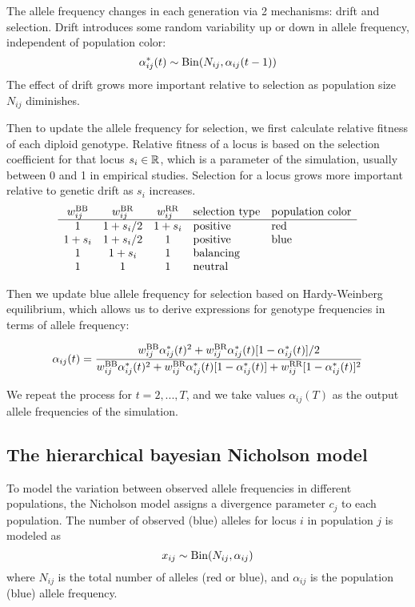 \documentclass[a4paper,12pt]{article}
\begin{document}
The allele frequency changes in each generation via
2 mechanisms: drift and selection. Drift introduces some random
variability up or down in allele frequency, independent of population
color:
$$\alpha_{ij}^*(t) \sim \operatorname{Bin}(N_{ij},\alpha_{ij}(t-1))$$
The effect of drift grows more important relative to selection as
population size $N_{ij}$ diminishes.

Then to update the allele frequency for selection, we first calculate
relative fitness of each diploid genotype. Relative fitness of a locus
is based on the selection coefficient for that locus $s_i\in \mathbb R$,
which is a parameter of the simulation, usually between 0 and 1 in
empirical studies. Selection for a locus grows more important relative
to genetic drift as $s_i$ increases.
$$
\begin{array}{cccll}
w_{ij}^{\text{BB}} & w_{ij}^{\text{BR}} & w_{ij}^{\text{RR}} & \text{selection type} & \text{population color}\\
\hline
1 & 1+s_i/2 & 1+s_i & \text{positive}& \text{red}\\
1+s_i & 1+s_i/2 & 1 & \text{positive}& \text{blue}\\
1 & 1+s_i & 1 & \text{balancing}& \\
1 & 1 & 1 & \text{neutral}& 
\end{array}
$$

Then we update blue allele frequency for selection based on
Hardy-Weinberg equilibrium, which allows us to derive expressions for
genotype frequencies in terms of allele frequency:

$$\alpha_{ij}(t) = \frac{
w_{ij}^{\text{BB}}\alpha_{ij}^*(t)^2 + w_{ij}^{\text{BR}}\alpha_{ij}^*(t)[1-\alpha_{ij}^*(t)]/2 }{
w_{ij}^{\text{BB}}\alpha_{ij}^*(t)^2 + w_{ij}^{\text{BR}}\alpha_{ij}^*(t)[1-\alpha_{ij}^*(t)] + w_{ij}^{\text{RR}}[1-\alpha_{ij}^*(t)]^2
   }$$

   We repeat the process for $t=2, ..., T$, and we take values
   $\alpha_{ij}(T)$ as the output allele frequencies of the
   simulation.



\subsection{The hierarchical bayesian Nicholson model}

To model the variation between observed allele frequencies in
different populations, the Nicholson model assigns a divergence
parameter $c_j$ to each population. The number of observed (blue)
alleles for locus $i$ in population $j$ is modeled as
$$x_{ij}\sim \operatorname{Bin}(N_{ij},\alpha_{ij})$$ where $N_{ij}$ is the total
number of alleles (red or blue), and $\alpha_{ij}$ is the population
(blue) allele frequency.
\end{document}
